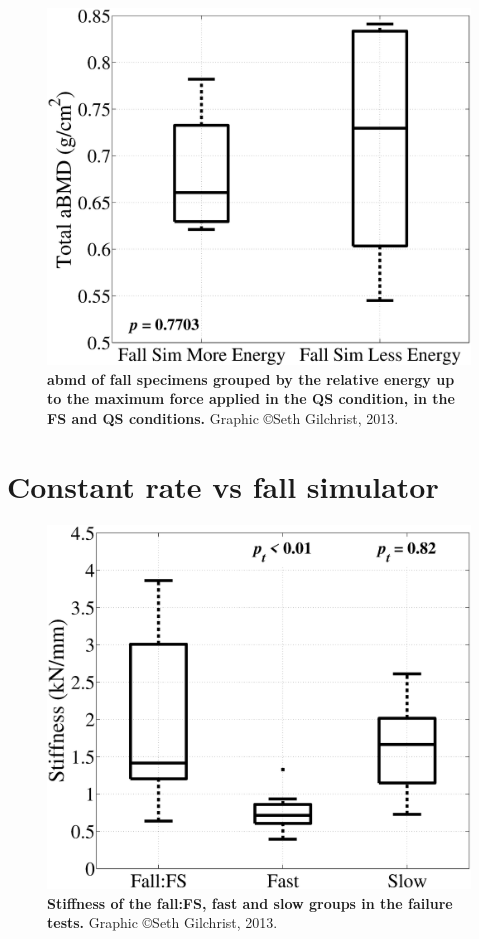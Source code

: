 \begin{figure}
\centering
\includegraphics[width=\linewidth]{./appendixPlots/figures/DXA_DeltaEng}
\caption[\acs*{abmd} grouped by energy]{\textbf{\ac{abmd} of fall specimens grouped by the relative energy up to the maximum force applied in the QS condition, in the FS and QS conditions.} Graphic \copyright Seth Gilchrist, 2013.}
\label{fig:DXA_DeltaEng}
\end{figure}
\clearpage

\section{Constant rate \acs*{vs} fall simulator}
\label{sec:additional_CR_FS_ratesIdeal}

\begin{figure}[h]
\centering
\includegraphics[width=\linewidth]{./appendixPlots/figures/StiffnessAll}
\caption[Stiffness of groups in failure tests]{\textbf{Stiffness of the fall:FS, fast and slow groups in the failure tests.} Graphic \copyright Seth Gilchrist, 2013.}
\label{fig:StiffnessAll}
\end{figure}
\clearpage

